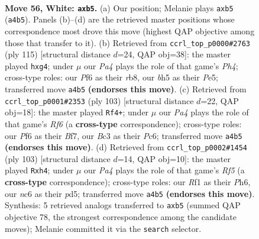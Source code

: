 \documentclass[11pt]{article}
\begin{document}
\clearpage

\begin{figure}[p]\centering
\begin{subfigure}{0.46\textwidth}\centering
\resizebox{\linewidth}{!}{%
\newchessgame
\chessboard[
  setfen={2k5/3r4/2n2P2/1p5b/P7/2B5/7K/5R2 w - - 0 56},
  showmover=false,
  pgfstyle=straightmove, color=movearrow, markmove={a4-b5}
]}
\caption{}
\end{subfigure}\hfill
\begin{subfigure}{0.46\textwidth}\centering
\resizebox{\linewidth}{!}{%
\newchessgame
\chessboard[
  setfen={1R6/8/8/2k1p2p/4PbPp/8/6K1/8 b - - 0 58},
  showmover=false,
  pgfstyle=straightmove, color=movearrow, markmove={h5-g4}
]}
\caption{}
\end{subfigure}
\\[4pt]
\begin{subfigure}{0.46\textwidth}\centering
\resizebox{\linewidth}{!}{%
\newchessgame
\chessboard[
  setfen={2k5/5b2/2p2p2/8/1P1K4/2N2r2/7R/8 b - - 6 52},
  showmover=false,
  pgfstyle=straightmove, color=movearrow, markmove={f3-f4}
]}
\caption{}
\end{subfigure}\hfill
\begin{subfigure}{0.46\textwidth}\centering
\resizebox{\linewidth}{!}{%
\newchessgame
\chessboard[
  setfen={7k/8/B6p/2bP4/3p1r1P/1R6/6K1/8 b - - 0 52},
  showmover=false,
  pgfstyle=straightmove, color=movearrow, markmove={f4-h4}
]}
\caption{}
\end{subfigure}
\caption{\textbf{Move 56, White: \texttt{axb5}.} (a) Our position; Melanie plays \texttt{axb5} (\texttt{a4b5}). Panels (b)--(d) are the retrieved master positions whose correspondence most drove this move (highest QAP objective among those that transfer to it). (b) Retrieved from \texttt{ccrl\_top\_p0000\#2763} (ply 115) [structural distance $d$=24, QAP obj=38]: the master played \texttt{hxg4}; under $\mu$ our \emph{Pa4} plays the role of that game's \emph{Ph4}; cross-type roles: our \emph{P}f6 as their \emph{r}b8, our \emph{b}h5 as their \emph{P}e5; transferred move \texttt{a4b5} \textbf{(endorses this move)}. (c) Retrieved from \texttt{ccrl\_top\_p0001\#2353} (ply 103) [structural distance $d$=22, QAP obj=18]: the master played \texttt{Rf4+}; under $\mu$ our \emph{Pa4} plays the role of that game's \emph{Rf6} (a \textbf{cross-type} correspondence); cross-type roles: our \emph{P}f6 as their \emph{B}f7, our \emph{B}c3 as their \emph{P}c6; transferred move \texttt{a4b5} \textbf{(endorses this move)}. (d) Retrieved from \texttt{ccrl\_top\_p0002\#1454} (ply 103) [structural distance $d$=14, QAP obj=10]: the master played \texttt{Rxh4}; under $\mu$ our \emph{Pa4} plays the role of that game's \emph{Rf5} (a \textbf{cross-type} correspondence); cross-type roles: our \emph{R}f1 as their \emph{P}h6, our \emph{n}c6 as their \emph{p}d5; transferred move \texttt{a4b5} \textbf{(endorses this move)}. Synthesis: 5 retrieved analogs transferred to \texttt{axb5} (summed QAP objective 78, the strongest correspondence among the candidate moves); Melanie committed it via the \texttt{search} selector.}
\label{fig:thought-m110}
\end{figure}
\end{document}
